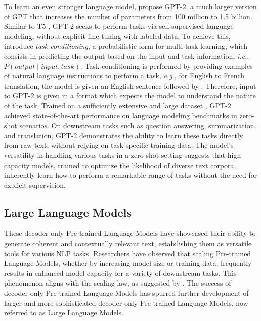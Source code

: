 To learn an even stronger language model, \citet{radford2019language} propose \ac{GPT}-2, a much larger version of \ac{GPT} that increases the number of parameters from 100 million to 1.5 billion. Similar to T5 \citep{raffel2020exploring}, \ac{GPT}-2 seeks to perform tasks via self-supervised language modeling, without explicit fine-tuning with labeled data. To achieve this, \citet{radford2019language} introduce \textit{task conditioning}, a probabilistic form for multi-task learning, which consists in predicting the output based on the input and task information, \textit{i.e.}, $P(output \mid input, task)$. Task conditioning is performed by providing examples of natural language instructions to perform a task, \textit{e.g.}, for English to French translation, the model is given an English sentence followed by . Therefore, input to \ac{GPT}-2 is given in a format which expects the model to understand the nature of the task. Trained on a sufficiently extensive and large dataset \citep{radford2019language}, \ac{GPT}-2 achieved state-of-the-art performance on language modeling benchmarks \citep{marcus1993building, chelba2013one, merity2016pointer} in zero-shot scenarios. On downstream tasks such as question answering, summarization, and translation, \ac{GPT}-2 demonstrates the ability to learn these tasks directly from raw text, without relying on task-specific training data. The model's versatility in handling various tasks in a zero-shot setting suggests that high-capacity models, trained to optimize the likelihood of diverse text corpora, inherently learn how to perform a remarkable range of tasks without the need for explicit supervision.




\subsection{Large Language Models}

These decoder-only Pre-trained Language Models have showcased their ability to generate coherent and contextually relevant text, estabilishing them as versatile tools for various \ac{NLP} tasks. Researchers have observed that scaling Pre-trained Language Models, whether by increasing model size or training data, frequently results in enhanced model capacity for a variety of downstream tasks. This phenomenon aligns with the scaling law, as suggested by \citet{kaplan2020scaling}. The success of decoder-only Pre-trained Language Models has spurred further development of larger and more sophisticated decoder-only Pre-trained Language Models, now referred to as Large Language Models.

